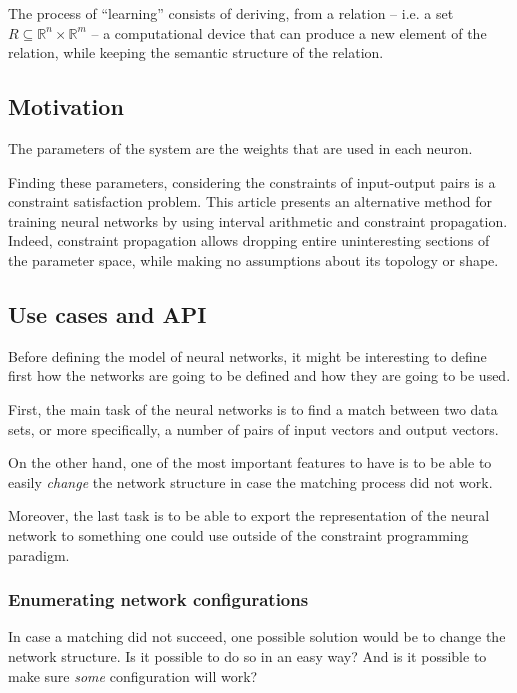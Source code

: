 \documentclass[a4paper, 10pt]{article}
\begin{document}
The process of ``learning'' consists of deriving, from a relation
-- i.e. a set $R \subseteq \mathbb{R}^n \times \mathbb{R}^m$ -- a computational
device that can produce a new element of the relation, while keeping the
semantic structure of the relation.  


\subsection*{Motivation}

The parameters of the system are the weights that are used in each neuron.

Finding these parameters, considering the constraints of input-output pairs is a
constraint satisfaction problem. This article presents an alternative method for
training neural networks by using interval arithmetic and constraint
propagation. Indeed, constraint propagation allows dropping entire uninteresting
sections of the parameter space, while making no assumptions about its topology
or shape.

\subsection*{Use cases and API} 

Before defining the model of neural networks, it might be interesting to
define first how the networks are going to be defined and how they are
going to be used.

First, the main task of the neural networks is to find a match between two data
sets, or more specifically, a number of pairs of input vectors and output
vectors.

On the other hand, one of the most important features to have is to be able to
easily \emph{change} the network structure in case the matching process did not
work. 

Moreover, the last task is to be able to export the representation of the neural
network to something one could use outside of the constraint programming
paradigm.

\subsubsection*{Enumerating network configurations}
In case a matching did not succeed, one possible solution would be to change the
network structure. Is it possible to do so in an easy way? And is it possible to
make sure \emph{some} configuration will work?
\end{document}
